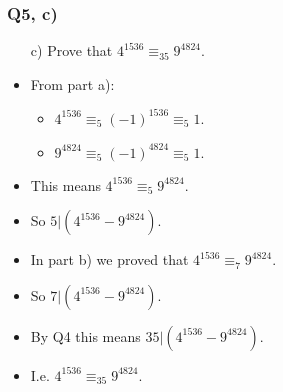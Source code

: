 \documentclass[handout]{beamer}
\begin{document}
\begin{frame}
\frametitle{Q5, c)}
\begin{enumerate}
\item[c)] Prove that $4^{1536}\equiv_{35} 9^{4824}$.
\end{enumerate}

\begin{itemize}
\item From part a):
\vspace{0.2cm}
\begin{itemize}
\item $4^{1536}\equiv_5 (-1)^{1536} \equiv_5 1$.
\vspace{0.2cm}
\item $9^{4824} \equiv_5 (-1)^{4824} \equiv_5 1.$
\end{itemize} 
\vspace{0.3cm}
\item This means $4^{1536}\equiv_5 9^{4824}$. 
\vspace{0.3cm}
\item So $5|(4^{1536}- 9^{4824}).$ 
\vspace{0.3cm}
\item In part b) we proved that $4^{1536}\equiv_7 9^{4824}$. 
\vspace{0.3cm}
\item So $7|(4^{1536}- 9^{4824}).$ 
\vspace{0.3cm}
\item By Q4 this means $35|(4^{1536}- 9^{4824}).$
\vspace{0.3cm}
\item  I.e. $4^{1536}\equiv_{35} 9^{4824}.$
\end{itemize}
\end{frame}
\end{document}
